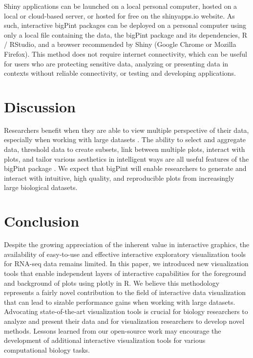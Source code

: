 \documentclass[parskip=full]{bmcart} %
\begin{document}
Shiny applications can be launched on a local personal computer, hosted on a local or cloud-based server, or hosted for free on the shinyapps.io website. As such, interactive bigPint packages can be deployed on a personal computer using only a local file containing the data, the bigPint package and its dependencies, R / RStudio, and a browser recommended by Shiny (Google Chrome or Mozilla Firefox). This method does not require internet connectivity, which can be useful for users who are protecting sensitive data, analyzing or presenting data in contexts without reliable connectivity, or testing and developing applications.

\section*{Discussion}

Researchers benefit when they are able to view multiple perspective of their data, especially when working with large datasets \cite{swayne2003ggobi, cook2007interactive}. The ability to select and aggregate data, threshold data to create subsets, link between multiple plots, interact with plots, and tailor various aesthetics in intelligent ways are all useful features of the bigPint package \cite{o2010visualizing, pavlopoulos2015visualizing, kerren2007human}. We expect that bigPint will enable researchers to generate and interact with intuitive, high quality, and reproducible plots from increasingly large biological datasets. 

\section*{Conclusion}

Despite the growing appreciation of the inherent value in interactive graphics, the availability of easy-to-use and effective interactive exploratory visualization tools for RNA-seq data remains limited. In this paper, we introduced new visualization tools that enable independent layers of interactive capabilities for the foreground and background of plots using plotly in R. We believe this methodology represents a fairly novel contribution to the field of interactive data visualization that can lead to sizable performance gains when working with large datasets. Advocating state-of-the-art visualization tools is crucial for biology researchers to analyze and present their data and for visualization researchers to develop novel methods. Lessons learned from our open-source work may encourage the development of additional interactive visualization tools for various computational biology tasks.
\end{document}
